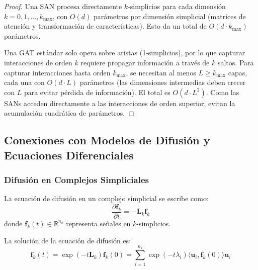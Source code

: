 \begin{proof}
Una SAN procesa directamente $k$-simplicios para cada dimensión $k = 0, 1, \ldots, k_{\max}$, con $O(d)$ parámetros por dimensión simplicial (matrices de atención y transformación de características). Esto da un total de $O(d \cdot k_{\max})$ parámetros.

Una \gls{GAT} estándar solo opera sobre aristas (1-simplicios), por lo que capturar interacciones de orden $k$ requiere propagar información a través de $k$ saltos. Para capturar interacciones hasta orden $k_{\max}$, se necesitan al menos $L \geq k_{\max}$ capas, cada una con $O(d \cdot L)$ parámetros (las dimensiones intermedias deben crecer con $L$ para evitar pérdida de información). El total es $O(d \cdot L^2)$. Como las SANs acceden directamente a las interacciones de orden superior, evitan la acumulación cuadrática de parámetros.
\end{proof}

\subsection{Conexiones con Modelos de Difusión y Ecuaciones Diferenciales}

\subsubsection{Difusión en Complejos Simpliciales}

\begin{definition}\label{def:ecuacion_difusion_simplicial}
La ecuación de difusión en un complejo simplicial se escribe como:
\begin{equation}
    \frac{\partial \mathbf{f}_k}{\partial t} = -\mathbf{L}_k \mathbf{f}_k
\end{equation}
donde $\mathbf{f}_k(t) \in \mathbb{R}^{n_k}$ representa señales en $k$-simplicios.
\end{definition}

\begin{theorem}\label{thm:solucion_difusion_simplicial}
La solución de la ecuación de difusión es:
\begin{equation}
    \mathbf{f}_k(t) = \exp(-t\mathbf{L}_k) \mathbf{f}_k(0) = \sum_{i=1}^{n_k} \exp(-t\lambda_i) \langle \mathbf{u}_i, \mathbf{f}_k(0) \rangle \mathbf{u}_i
\end{equation}
\end{theorem}

